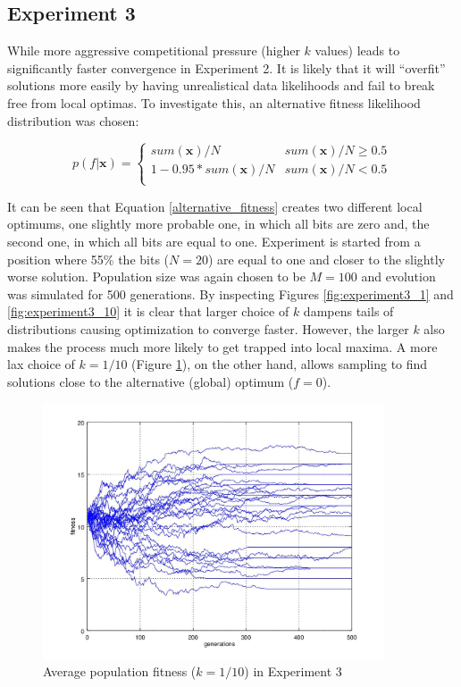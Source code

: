 \documentclass{article}
\begin{document}
\subsection{Experiment 3}

While more aggressive competitional pressure (higher $k$ values) leads to significantly faster convergence in Experiment 2. It is likely that it will ``overfit'' solutions more easily by having unrealistical data likelihoods and fail to break free from local optimas. To investigate this, an alternative fitness likelihood distribution was chosen:

\begin{equation}
  p(f|\mathbf{x}) = 
  \begin{cases}  
    sum(\mathbf{x})/N & sum(\mathbf{x})/N \geq 0.5 \\
    1 - 0.95*sum(\mathbf{x})/N & sum(\mathbf{x})/N < 0.5 \\
  \end{cases}
  \label{alternative_fitness}
\end{equation}

It can be seen that Equation \ref{alternative_fitness} creates two different local optimums, one slightly more probable one, in which all bits are zero and, the second one, in which all bits are equal to one. Experiment is started from a position where 55\% the bits ($N=20$) are equal to one and closer to the slightly worse solution. Population size was again chosen to be $M=100$ and evolution was simulated for 500 generations.
By inspecting Figures \ref{fig:experiment3_1} and \ref{fig:experiment3_10} it is clear that larger choice of $k$ dampens tails of distributions causing optimization to converge faster. However, the larger $k$ also makes the process much more likely to get trapped into local maxima. A more lax choice of $k=1/10$ (Figure \ref{fig:experiment3_01}), on the other hand, allows sampling to find solutions close to the alternative (global) optimum ($f = 0$).

\begin{figure}

\centering
\includegraphics[keepaspectratio,width=0.9\textwidth]{experiment3figure2_01.jpg}

\caption{Average population fitness ($k = 1/10$) in Experiment 3}

\label{fig:experiment3_01}

\end{figure}
\end{document}
